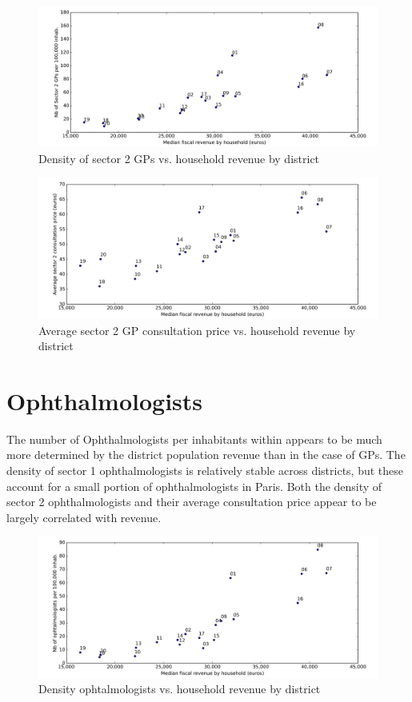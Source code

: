 \documentclass[11pt]{article}
\begin{document}
\begin{figure}[H]
    \caption{Density of sector 2 GPs vs. household revenue by district}
	\centering
		\includegraphics[width=16cm]{images/GP_Ardt_DensityS2VsRevenue.png}
\end{figure}

\begin{figure}[H]
    \caption{Average sector 2 GP consultation price vs. household revenue by district}
	\centering
		\includegraphics[width=16cm]{images/GP_Ardt_ConsultationS2VsRevenue.png}
\end{figure}

\section{Ophthalmologists}

The number of Ophthalmologists per inhabitants within appears to be much more determined by the district population revenue than in the case of GPs. The density of sector 1 ophthalmologists is relatively stable across districts, but these account for a small portion of ophthalmologists in Paris. Both the density of sector 2 ophthalmologists and their average consultation price appear to be largely correlated with revenue.

\begin{figure}[H]
    \caption{Density ophtalmologists vs. household revenue by district}
	\centering
		\includegraphics[width=16cm]{images/Ophtalmo_Ardt_DensityVsRevenue.png}
\end{figure}
\end{document}
